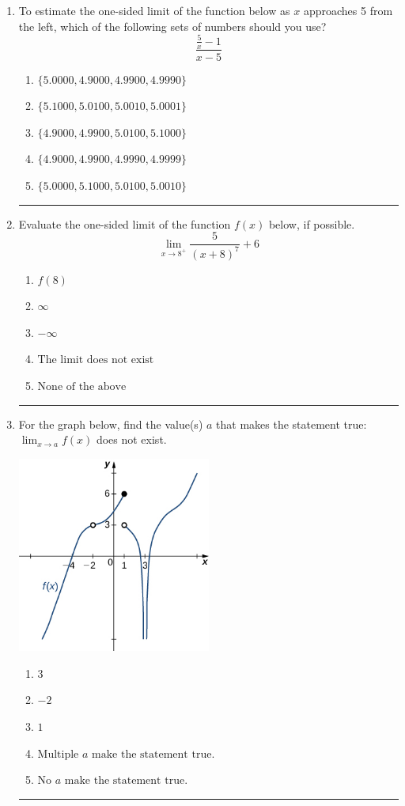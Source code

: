 \documentclass[14pt]{extbook}
\newcommand{\litem}[1]{\item#1\hspace*{-1cm}\rule{\textwidth}{0.4pt}}
\begin{document}
\begin{enumerate}
{\begin{enumerate}[label=\Alph*.]
\end{enumerate} }
\litem{
To estimate the one-sided limit of the function below as $x$ approaches 5 from the left, which of the following sets of numbers should you use?\[ \frac{\frac{5}{x} - 1}{x - 5} \]\begin{enumerate}[label=\Alph*.]
\item \( \{ 5.0000, 4.9000, 4.9900, 4.9990 \} \)
\item \( \{ 5.1000, 5.0100, 5.0010, 5.0001 \} \)
\item \( \{ 4.9000, 4.9900, 5.0100, 5.1000 \} \)
\item \( \{ 4.9000, 4.9900, 4.9990, 4.9999 \} \)
\item \( \{ 5.0000, 5.1000, 5.0100, 5.0010 \} \)

\end{enumerate} }
\litem{
Evaluate the one-sided limit of the function $f(x)$ below, if possible.\[ \lim_{x \rightarrow 8^+} \frac{5}{(x+8)^7}+6 \]\begin{enumerate}[label=\Alph*.]
\item \( f(8) \)
\item \( \infty \)
\item \( -\infty \)
\item \( \text{The limit does not exist} \)
\item \( \text{None of the above} \)

\end{enumerate} }
\litem{
For the graph below, find the value(s) $a$ that makes the statement true: $ \displaystyle \lim_{x \rightarrow a} f(x)$ does not exist.
\begin{center}
    \includegraphics[width=0.5\textwidth]{../Figures/evaluateLimitGraphicallyCopyB.png}
\end{center}
\begin{enumerate}[label=\Alph*.]
\item \( 3 \)
\item \( -2 \)
\item \( 1 \)
\item \( \text{Multiple } a \text{ make the statement true}. \)
\item \( \text{No } a \text{ make the statement true}. \)


\end{enumerate}}
\end{enumerate}
\end{document}
